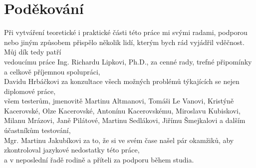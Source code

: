 \chapter*{Poděkování}   %
\thispagestyle{empty}   %

Při vytváření teoretické i praktické části této práce mi svými radami, podporou nebo jiným způsobem přispělo několik lidí, kterým bych rád vyjádřil vděčnost. Můj dík tedy patří\\[3mm]
vedoucímu práce Ing. Richardu Lipkovi, Ph.D., za cenné rady, trefné připomínky a celkově příjemnou spolupráci,\\[3mm]
Davidu Hrbáčkovi za konzultace všech možných problémů týkajících se nejen dip\-lomové práce,\\[3mm]
všem testerům, jmenovitě Martinu Altmanovi, Tomáši Le Vanovi, Kristýně Kacerovské, Olze Kacerovské, Antonínu Kacerovskému, Miroslavu Kubiskovi, Milanu Mrázovi, Janě Pilátové, Martinu Sedlákovi, Jiřímu Šmejkalovi a dalším účastníkům testování,\\[3mm]
Mgr. Martinu Jakubíkovi za to, že si ve svém čase našel pár okamžiků, aby zkontroloval jazykové nedostatky této práce,\\[3mm]
a v neposlední řadě rodině a příteli za podporu během studia.


